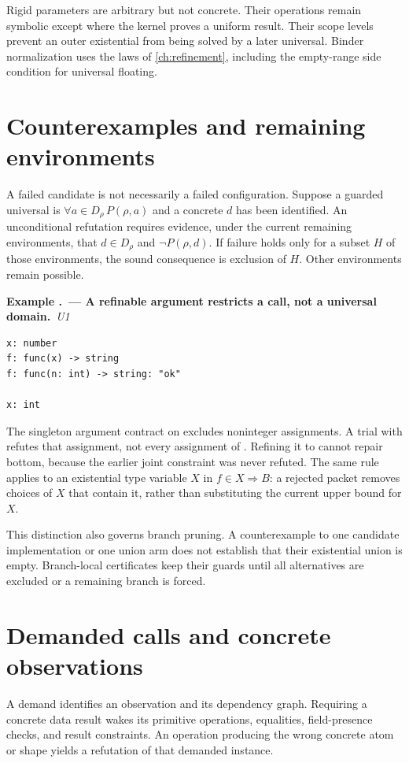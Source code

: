 \documentclass[11pt,a4paper,oneside]{report}
\newcommand{\code}[1]{\texttt{\detokenize{#1}}}
\newcommand{\Uone}{\ensuremath{\profilecal{U}_{1}}}
\def\Uone{U1}%
\theoremstyle{remark}
\newcounter{example}[chapter]
\renewcommand{\theexample}{\thechapter.\arabic{example}}
\newcommand{\example}[2]{\refstepcounter{example}\Needspace{5\baselineskip}\par\textbf{Example \theexample\ --- #1.}\ \textit{#2}\par\nopagebreak[4]}
\begin{document}
Rigid parameters are arbitrary but not concrete. Their operations remain
symbolic except where the kernel proves a uniform result. Their scope levels
prevent an outer existential from being solved by a later universal. Binder
normalization uses the laws of \cref{ch:refinement}, including the empty-range
side condition for universal floating.

\section{Counterexamples and remaining environments}
A failed candidate is not necessarily a failed configuration. Suppose a guarded
universal is $\forall a\in D_\rho\,P(\rho,a)$ and a concrete $d$ has been
identified. An unconditional refutation requires evidence, under the current
remaining environments, that $d\in D_\rho$ and $\neg P(\rho,d)$.
If failure holds only for a subset $H$ of those environments, the sound
consequence is exclusion of $H$. Other environments remain possible.

\example{A refinable argument restricts a call, not a universal domain}{\Uone{}}
\par\noindent\begin{minipage}{\linewidth}
\begin{lstlisting}
x: number
f: func(x) -> string
f: func(n: int) -> string: "ok"

x: int
\end{lstlisting}
\end{minipage}\par
The singleton argument contract on \code{x} excludes noninteger assignments.
A trial with \code{x = 1.5} refutes that assignment, not every assignment of
\code{x}. Refining it to \code{int} cannot repair bottom, because the earlier
joint constraint was never refuted. The same rule applies to an existential
type variable $X$ in $f\in X\Rightarrow B$: a rejected packet removes choices
of $X$ that contain it, rather than substituting the current upper bound for $X$.

This distinction also governs branch pruning. A counterexample to one candidate
implementation or one union arm does not establish that their existential
union is empty. Branch-local certificates keep their guards until all
alternatives are excluded or a remaining branch is forced.

\section{Demanded calls and concrete observations}
A demand identifies an observation and its dependency graph. Requiring a
concrete data result wakes its primitive operations, equalities, field-presence
checks, and result constraints. An operation producing the wrong concrete atom
or shape yields a refutation of that demanded instance.
\end{document}

